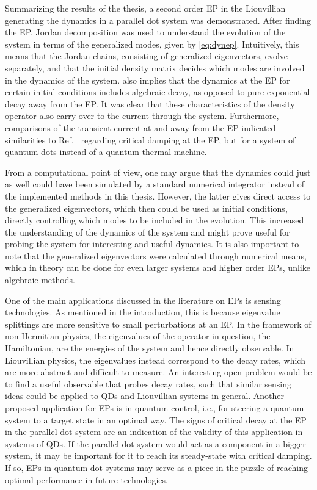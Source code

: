 \documentclass[../main.tex]{subfiles}
\begin{document}
Summarizing the results of the thesis, a second order EP in the Liouvillian generating the dynamics in a parallel dot system was demonstrated. After finding the EP, Jordan decomposition was used to understand the evolution of the system in terms of the generalized modes, given by \cref{eq:dynep}. Intuitively, this means that the Jordan chains, consisting of generalized eigenvectors, evolve separately, and that the initial density matrix decides which modes are involved in the dynamics of the system.  also implies that the dynamics at the EP for certain initial conditions includes algebraic decay, as opposed to pure exponential decay away from the EP. It was clear that these characteristics of the density operator also carry over to the current through the system. Furthermore, comparisons of the transient current at and away from the EP indicated similarities to Ref.~\cite{thermal} regarding critical damping at the EP, but for a system of quantum dots instead of a quantum thermal machine.

From a computational point of view, one may argue that the dynamics could just as well could have been simulated by a standard numerical integrator instead of the implemented methods in this thesis. However, the latter gives direct access to the generalized eigenvectors, which then could be used as initial conditions, directly controlling which modes to be included in the evolution. This increased the understanding of the dynamics of the system and might prove useful for probing the system for interesting and useful dynamics. It is also important to note that the generalized eigenvectors were calculated through numerical means, which in theory can be done for even larger systems and higher order EPs, unlike algebraic methods. %

One of the main applications discussed in the literature on EPs is sensing technologies. As mentioned in the introduction, this is because eigenvalue splittings are more sensitive to small perturbations at an EP. In the framework of non-Hermitian physics, the eigenvalues of the operator in question, the Hamiltonian, are the energies of the system and hence directly observable. In Liouvillian physics, the eigenvalues instead correspond to the decay rates, which are more abstract and difficult to measure. An interesting open problem would be to find a useful observable that probes decay rates, such that similar sensing ideas could be applied to QDs and Liouvillian systems in general. Another proposed application for EPs is in quantum control, i.e., for steering a quantum system to a target state in an optimal way. The signs of critical decay at the EP in the parallel dot system are an indication of the validity of this application in systems of QDs. If the parallel dot system would act as a component in a bigger system, it may be important for it to reach its steady-state with critical damping. If so, EPs in quantum dot systems may serve as a piece in the puzzle of reaching optimal performance in future technologies.
\end{document}
